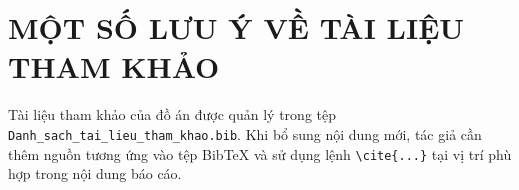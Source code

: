 \chapter*{MỘT SỐ LƯU Ý VỀ TÀI LIỆU THAM KHẢO}

Tài liệu tham khảo của đồ án được quản lý trong tệp \texttt{Danh\_sach\_tai\_lieu\_tham\_khao.bib}. Khi bổ sung nội dung mới, tác giả cần thêm nguồn tương ứng vào tệp BibTeX và sử dụng lệnh \texttt{\textbackslash cite\{...\}} tại vị trí phù hợp trong nội dung báo cáo.

